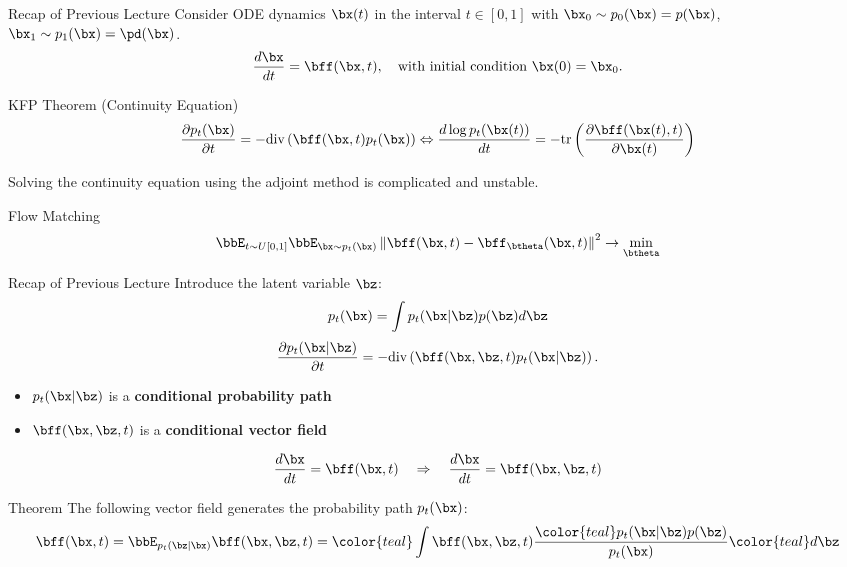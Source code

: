 \documentclass{beamer}
\begin{document}
\begin{frame}{Recap of Previous Lecture}
	Consider ODE dynamics $\bx(t)$ in the interval $t \in [0, 1]$ with $\bx_0 \sim p_0(\bx) = p(\bx)$, $\bx_1 \sim p_1(\bx) =  \pd(\bx)$.
	\[
		\frac{d \bx}{dt} = \bff (\bx, t),  \quad \text{with initial condition $\bx(0) = \bx_0$}.
	\]
	\vspace{-0.5cm}
	\begin{block}{KFP Theorem (Continuity Equation)}
		\vspace{-0.5cm}
		\[
			\frac{\partial p_t(\bx)}{\partial t} = - \text{div}\left(\bff(\bx, t) p_t(\bx)\right) \Leftrightarrow \frac{d \log p_t(\bx(t))}{d t} = - \text{tr} \left( \frac{\partial \bff(\bx(t), t)}{\partial \bx(t)} \right)
		\]
		\vspace{-0.3cm}
	\end{block}
	Solving the continuity equation using the adjoint method is complicated and unstable.
	\begin{block}{Flow Matching}
		\vspace{-0.3cm}
		\[
			\bbE_{t \sim U[0, 1]} \bbE_{\bx \sim p_t(\bx)}\left\| \bff(\bx, t) - \bff_{\btheta}(\bx, t) \right\|^2 \rightarrow \min_{\btheta}
		\]
		\vspace{-0.3cm}
	\end{block}
\end{frame}
\begin{frame}{Recap of Previous Lecture}
	\vspace{-0.3cm}
	Introduce the latent variable $\bz$:
	\[
		p_t(\bx) = \int p_t(\bx | \bz) p(\bz) d \bz 
	\]
	\vspace{-0.5cm}
	\[
		\frac{\partial p_t(\bx | \bz)}{\partial t} = - \text{div}\left(\bff(\bx, \bz, t) p_t(\bx | \bz)\right).
	\]
	\vspace{-0.3cm}
	\begin{itemize}
		\item $p_t(\bx | \bz)$ is a \textbf{conditional probability path}
		\item $\bff(\bx, \bz, t)$ is a \textbf{conditional vector field}
	\end{itemize}
	\[
		\frac{d\bx}{dt} = \bff(\bx, t) \quad \Rightarrow \quad \frac{d\bx}{dt} = \bff(\bx, \bz, t)
	\]
	\vspace{-0.5cm}
	\begin{block}{Theorem}
		The following vector field generates the probability path $p_t(\bx)$:
		\vspace{-0.2cm}
		\[
			\bff(\bx, t) = \bbE_{p_t(\bz | \bx)} \bff(\bx, \bz, t)  = {\color{teal}\int \bff(\bx, \bz, t)} \frac{\color{teal}p_t(\bx | \bz) p(\bz)}{p_t(\bx)} {\color{teal}d \bz}
		\]
		\vspace{-0.5cm}
	\end{block}
\end{frame}
\end{document}
